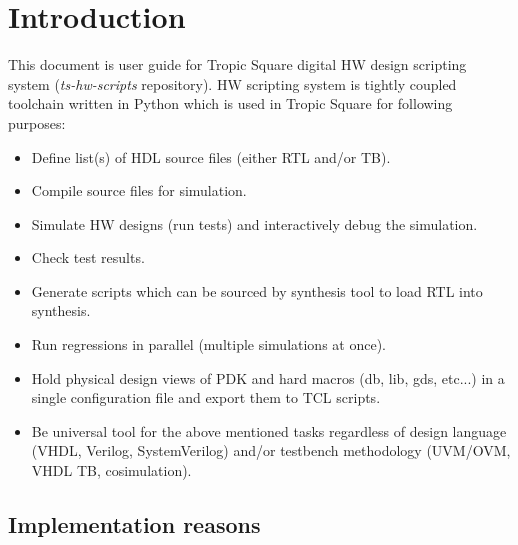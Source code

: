 \documentclass{tropic_design_spec}
\begin{document}
\pagebreak
\tableofcontents



\pagebreak
\section{Introduction}

This document is user guide for Tropic Square digital HW design scripting system
(\textit{ts-hw-scripts} repository). HW scripting system is tightly coupled
toolchain written in Python which is used in Tropic Square for following purposes:

\begin{itemize}
	\item{Define list(s) of HDL source files (either RTL and/or TB).}
	\item{Compile source files for simulation.}
	\item{Simulate HW designs (run tests) and interactively debug the simulation.}
	\item{Check test results.}
	\item{Generate scripts which can be sourced by synthesis tool to load RTL into
          synthesis.}
    \item{Run regressions in parallel (multiple simulations at once).}
    \item{Hold physical design views of PDK and hard macros (db, lib, gds, etc...)
          in a single configuration file and export them to TCL scripts.}
	\item{Be universal tool for the above mentioned tasks regardless of design
	      language (VHDL, Verilog, SystemVerilog) and/or testbench methodology
	      (UVM/OVM, VHDL TB, cosimulation).}
\end{itemize}

\subsection*{Implementation reasons}
\end{document}
